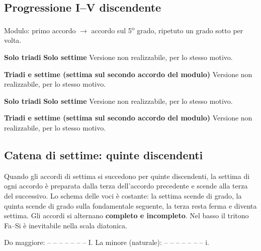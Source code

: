 \subsection{Progressione I–V discendente}
\label{subsec:prog_i5d}
Modulo: primo accordo $\rightarrow$ accordo sul 5\textsuperscript{o} grado, ripetuto un grado sotto per volta.

\begin{esempio}
	\label{ex:prog_i5d_dia}
	\textbf{Solo triadi}
	\textbf{Solo settime}
	Versione non realizzabile, per lo stesso motivo.

	\textbf{Triadi e settime (settima sul secondo accordo del modulo)}
	Versione non realizzabile, per lo stesso motivo.

\end{esempio}

\begin{esempio}
	\label{ex:prog_i5d_rea}
	\textbf{Solo triadi}
	\textbf{Solo settime}
	Versione non realizzabile, per lo stesso motivo.

	\textbf{Triadi e settime (settima sul secondo accordo del modulo)}
	Versione non realizzabile, per lo stesso motivo.

\end{esempio}

\subsection{Catena di settime: quinte discendenti}
\label{subsec:catena_settime}

Quando gli accordi di settima si succedono per quinte discendenti, la settima di ogni accordo è preparata dalla terza dell'accordo precedente e scende alla terza del successivo. Lo schema delle voci è costante: la settima scende di grado, la quinta scende di grado sulla fondamentale seguente, la terza resta ferma e diventa settima. Gli accordi si alternano \textbf{completo e incompleto}. Nel basso il tritono Fa--Si è inevitabile nella scala diatonica.

\begin{esempio}
	\label{ex:catena_do_la}
	Do maggiore:  --  --  --  --  --  --  -- I.
	La minore (naturale):  --  --  --  --  --  --  -- i.
\end{esempio}

